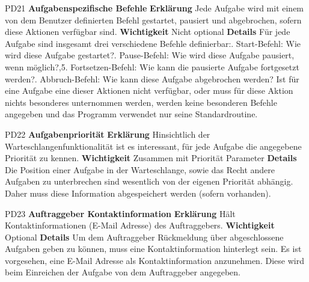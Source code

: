 \documentclass[a4paper,12pt]{article}
\begin{document}
\begin{itemize}[nosep]
\begin{minipage}[t]{\linewidth}
\item[PD21] \textbf{Aufgabenspezifische Befehle}
\subitem \textbf{Erklärung} Jede Aufgabe wird mit einem von dem Benutzer definierten Befehl gestartet, pausiert und abgebrochen, sofern diese Aktionen verfügbar sind.
\subitem \textbf{Wichtigkeit} Nicht optional
\subitem \textbf{Details} Für jede Aufgabe sind insgesamt drei verschiedene Befehle definierbar:. Start-Befehl: Wie wird diese Aufgabe gestartet?. Pause-Befehl: Wie wird diese Aufgabe pausiert, wenn möglich?,5. Fortsetzen-Befehl: Wie kann die pausierte Aufgabe fortgesetzt werden?. Abbruch-Befehl: Wie kann diese Aufgabe abgebrochen werden?\newline
Ist für eine Aufgabe eine dieser Aktionen nicht verfügbar, oder muss für diese Aktion nichts besonderes unternommen werden, werden keine besonderen Befehle angegeben und das Programm verwendet nur seine Standardroutine.
\end{minipage}
\pagebreak

\begin{minipage}[t]{\linewidth}
\item[PD22] \textbf{Aufgabenpriorität}
\subitem \textbf{Erklärung} Hinsichtlich der Warteschlangenfunktionalität ist es interessant, für jede Aufgabe die angegebene Priorität zu kennen.
\subitem \textbf{Wichtigkeit} Zusammen mit Priorität Parameter
\subitem \textbf{Details} Die Position einer Aufgabe in der Warteschlange, sowie das Recht andere Aufgaben zu unterbrechen sind wesentlich von der eigenen Priorität abhängig. Daher muss diese Information abgespeichert werden (sofern vorhanden).
\end{minipage}
\pagebreak

\begin{minipage}[t]{\linewidth}
\item[PD23] \textbf{Auftraggeber Kontaktinformation}
\subitem \textbf{Erklärung} Hält Kontaktinformationen (E-Mail Adresse) des Auftraggebers.
\subitem \textbf{Wichtigkeit} Optional
\subitem \textbf{Details} Um dem Auftraggeber Rückmeldung über abgeschlossene Aufgaben geben zu können, muss eine Kontaktinformation hinterlegt sein.\newline
Es ist vorgesehen, eine E-Mail Adresse als Kontaktinformation anzunehmen. Diese wird beim Einreichen der Aufgabe von dem Auftraggeber angegeben.
\end{minipage}
\pagebreak


\end{itemize}
\end{document}
